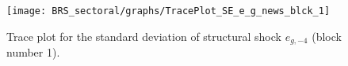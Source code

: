 \begin{figure}[H]
\centering
  \texttt{[image: BRS\_sectoral/graphs/TracePlot\_SE\_e\_g\_news\_blck\_1]}\\
    \caption{Trace plot for the standard deviation of structural shock ${e_{g,-4}}$ (block number 1).}
\end{figure}
